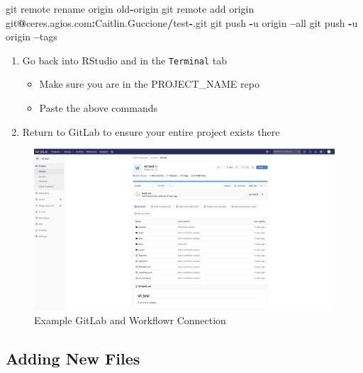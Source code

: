 \documentclass[]{book}
\newenvironment{Shaded}{\begin{snugshade}}{\end{snugshade}}
\newcommand{\NormalTok}[1]{#1}
\newcommand{\OperatorTok}[1]{\textcolor[rgb]{0.81,0.36,0.00}{\textbf{#1}}}
\providecommand{\tightlist}{%
  \setlength{\itemsep}{0pt}\setlength{\parskip}{0pt}}
\begin{document}
\begin{Shaded}
\begin{Highlighting}[]
\NormalTok{git remote rename origin old}\OperatorTok{-}\NormalTok{origin}
\NormalTok{git remote add origin git}\OperatorTok{@}\NormalTok{ceres.agios.com}\OperatorTok{:}\NormalTok{Caitlin.Guccione}\OperatorTok{/}\NormalTok{test}\OperatorTok{-}\NormalTok{.git}
\NormalTok{git push }\OperatorTok{-}\NormalTok{u origin }\OperatorTok{--}\NormalTok{all}
\NormalTok{git push }\OperatorTok{-}\NormalTok{u origin }\OperatorTok{--}\NormalTok{tags}
\end{Highlighting}
\end{Shaded}

\begin{enumerate}
\def\labelenumi{\arabic{enumi}.}
\setcounter{enumi}{2}
\tightlist
\item
  Go back into RStudio and in the \texttt{Terminal} tab

  \begin{itemize}
  \tightlist
  \item
    Make sure you are in the PROJECT\_NAME repo
  \item
    Paste the above commands
  \end{itemize}
\item
  Return to GitLab to ensure your entire project exists there
\end{enumerate}

\begin{figure}

{\centering \includegraphics[width=1\linewidth]{images/Workflow_Photos/screen_shot} 

}

\caption{Example GitLab and Workflowr Connection}\label{fig:a3}
\end{figure}

\hypertarget{adding-new-files}{%
\subsection{Adding New Files}\label{adding-new-files}}
\end{document}
